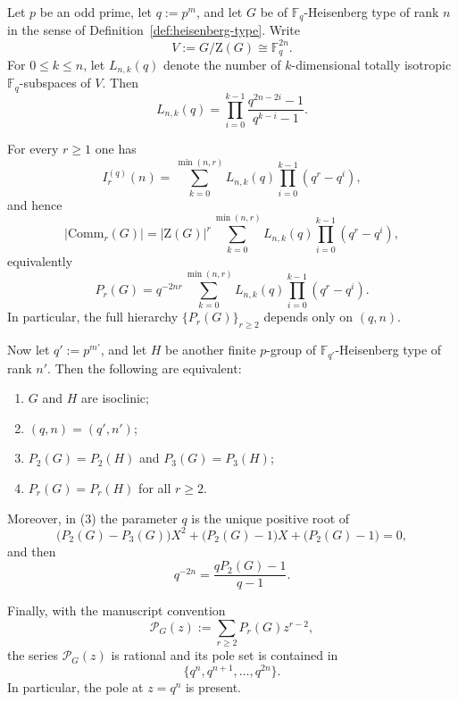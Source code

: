 \documentclass[10pt,a4paper]{amsart}
\newcommand{\Comm}{\mathrm{Comm}}
\newcommand{\Z}{\mathrm{Z}}
\begin{document}
\begin{theorem}\label{thm:heisenberg-full-hierarchy}\label{thm:rank2-heisenberg-isoclinism}
Let $p$ be an odd prime, let $q:=p^m$, and let $G$ be of $\mathbb F_q$-Heisenberg type of rank $n$
in the sense of Definition~\ref{def:heisenberg-type}. Write
\[
V:=G/\Z(G)\cong \mathbb F_q^{2n}.
\]
For $0\le k\le n$, let $L_{n,k}(q)$ denote the number of $k$-dimensional totally isotropic
$\mathbb F_q$-subspaces of $V$. Then
\[
L_{n,k}(q)=\prod_{i=0}^{k-1}\frac{q^{2n-2i}-1}{q^{k-i}-1}.
\]

For every $r\ge 1$ one has
\[
I_r^{(q)}(n)
=
\sum_{k=0}^{\min(n,r)}
L_{n,k}(q)\prod_{i=0}^{k-1}(q^r-q^i),
\]
and hence
\[
|\Comm_r(G)|
=
|\Z(G)|^r
\sum_{k=0}^{\min(n,r)}
L_{n,k}(q)\prod_{i=0}^{k-1}(q^r-q^i),
\]
equivalently
\[
P_r(G)
=
q^{-2nr}
\sum_{k=0}^{\min(n,r)}
L_{n,k}(q)\prod_{i=0}^{k-1}(q^r-q^i).
\]
In particular, the full hierarchy $\{P_r(G)\}_{r\ge2}$ depends only on $(q,n)$.

Now let $q':=p^{m'}$, and let $H$ be another finite $p$-group of $\mathbb F_{q'}$-Heisenberg type of rank $n'$.
Then the following are equivalent:
\begin{enumerate}
\item $G$ and $H$ are isoclinic;
\item $(q,n)=(q',n')$;
\item $P_2(G)=P_2(H)$ and $P_3(G)=P_3(H)$;
\item $P_r(G)=P_r(H)$ for all $r\ge2$.
\end{enumerate}
Moreover, in (3) the parameter $q$ is the unique positive root of
\[
\bigl(P_2(G)-P_3(G)\bigr)X^2+\bigl(P_2(G)-1\bigr)X+\bigl(P_2(G)-1\bigr)=0,
\]
and then
\[
q^{-2n}=\frac{qP_2(G)-1}{q-1}.
\]

Finally, with the manuscript convention
\[
\mathcal P_G(z):=\sum_{r\ge2}P_r(G)z^{r-2},
\]
the series $\mathcal P_G(z)$ is rational and its pole set is contained in
\[
\{q^n,q^{n+1},\dots,q^{2n}\}.
\]
In particular, the pole at $z=q^n$ is present.
\end{theorem}
\end{document}
